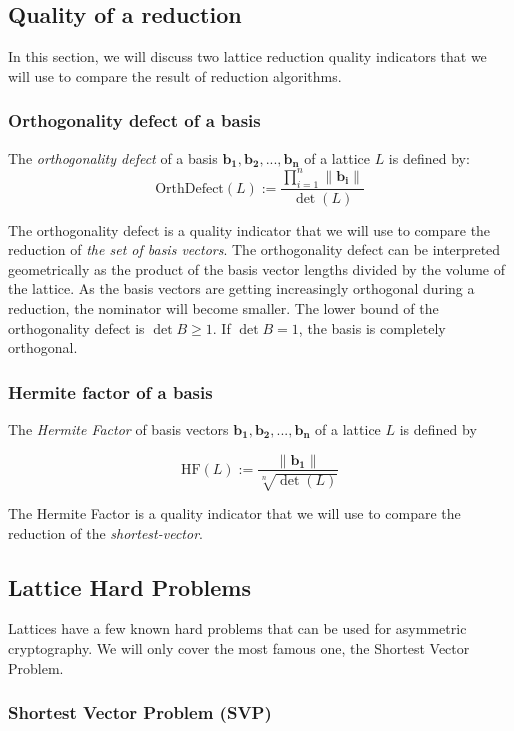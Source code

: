 \documentclass[10pt, a4paper]{article}
\renewcommand{\vec}[1]{\mathbf{#1}}
\begin{document}
\subsection{Quality of a reduction}

In this section, we will discuss two lattice reduction quality indicators that we will use to compare the result of reduction algorithms.

\subsubsection{Orthogonality defect of a basis}
The \emph{orthogonality defect} of a basis $\vec{b_1},\vec{b_2},...,\vec{b_n}$ of a lattice $L$ is defined by:
\[
    \text{OrthDefect}(L) := \frac{\displaystyle\prod^{n}_{i=1} \|\vec{b_i}\| }{\det(L)}
\]

The orthogonality defect is a quality indicator that we will use to compare the reduction of \emph{the set of basis vectors}. The orthogonality defect can be interpreted geometrically as the product of the basis vector lengths divided by the volume of the lattice. As the basis vectors are getting increasingly orthogonal during a reduction, the nominator will become smaller. The lower bound of the orthogonality defect is $\det B \ge 1$. If $\det B = 1$, the basis is completely orthogonal.

\subsubsection{Hermite factor of a basis}
The \emph{Hermite Factor} of basis vectors $\vec{b_1}, \vec{b_2},...,\vec{b_n}$ of a lattice $L$ is defined by

\[
    \text{HF}(L) := \frac{\|\vec{b_1}\|}{\sqrt[n]{\det(L)}}
\]

The Hermite Factor is a quality indicator that we will use to compare the reduction of the \emph{shortest-vector}.

\subsection{Lattice Hard Problems}

Lattices have a few known hard problems that can be used for asymmetric cryptography. We will only cover the most famous one, the Shortest Vector Problem.

\subsubsection{Shortest Vector Problem (SVP)}
\end{document}
